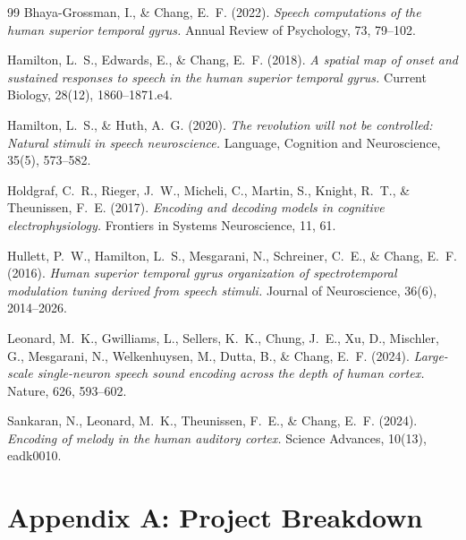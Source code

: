 \documentclass[11pt]{article}
\begin{document}
\begin{thebibliography}{99}
Bhaya-Grossman, I., \& Chang, E.\ F. (2022).
\emph{Speech computations of the human superior temporal gyrus.}
Annual Review of Psychology, 73, 79--102.

Hamilton, L.\ S., Edwards, E., \& Chang, E.\ F. (2018).
\emph{A spatial map of onset and sustained responses to speech in the human superior temporal gyrus.}
Current Biology, 28(12), 1860--1871.e4.

Hamilton, L.\ S., \& Huth, A.\ G. (2020).
\emph{The revolution will not be controlled: Natural stimuli in speech neuroscience.}
Language, Cognition and Neuroscience, 35(5), 573--582.

Holdgraf, C.\ R., Rieger, J.\ W., Micheli, C., Martin, S., Knight, R.\ T., \& Theunissen, F.\ E. (2017).
\emph{Encoding and decoding models in cognitive electrophysiology.}
Frontiers in Systems Neuroscience, 11, 61.

Hullett, P.\ W., Hamilton, L.\ S., Mesgarani, N., Schreiner, C.\ E., \& Chang, E.\ F. (2016).
\emph{Human superior temporal gyrus organization of spectrotemporal modulation tuning derived from speech stimuli.}
Journal of Neuroscience, 36(6), 2014--2026.

Leonard, M.\ K., Gwilliams, L., Sellers, K.\ K., Chung, J.\ E., Xu, D., Mischler, G., Mesgarani, N., Welkenhuysen, M., Dutta, B., \& Chang, E.\ F. (2024).
\emph{Large-scale single-neuron speech sound encoding across the depth of human cortex.}
Nature, 626, 593--602.

Sankaran, N., Leonard, M.\ K., Theunissen, F.\ E., \& Chang, E.\ F. (2024).
\emph{Encoding of melody in the human auditory cortex.}
Science Advances, 10(13), eadk0010.

\end{thebibliography}

\clearpage
\appendix

\section*{Appendix A: Project Breakdown}
\end{document}
